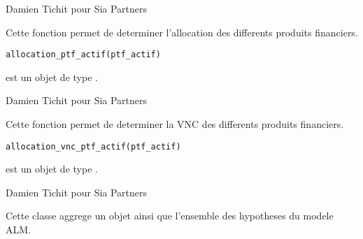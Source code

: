 \documentclass[a4paper]{book}
\begin{document}
%
\begin{Author}\relax
Damien Tichit pour Sia Partners
\end{Author}
%
\begin{Description}\relax
Cette fonction permet de determiner l'allocation des differents produits financiers.
\end{Description}
%
\begin{Usage}
\begin{verbatim}
allocation_ptf_actif(ptf_actif)
\end{verbatim}
\end{Usage}
%
\begin{Arguments}
\begin{ldescription}
\item[\code{ptf\_actif}] est un objet de type .
\end{ldescription}
\end{Arguments}
%
\begin{Author}\relax
Damien Tichit pour Sia Partners
\end{Author}
%
\begin{Description}\relax
Cette fonction permet de determiner la VNC des differents produits financiers.
\end{Description}
%
\begin{Usage}
\begin{verbatim}
allocation_vnc_ptf_actif(ptf_actif)
\end{verbatim}
\end{Usage}
%
\begin{Arguments}
\begin{ldescription}
\item[\code{ptf\_actif}] est un objet de type .
\end{ldescription}
\end{Arguments}
%
\begin{Author}\relax
Damien Tichit pour Sia Partners
\end{Author}
%
\begin{Description}\relax
Cette classe aggrege un objet  ainsi que l'ensemble des hypotheses du modele ALM.
\end{Description}
\end{document}
